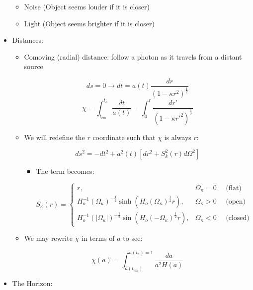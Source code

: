 \begin{itemize}
\begin{itemize}
      \item Noise (Object seems louder if it is closer)

      \item Light (Object seems brighter if it is closer)

    \end{itemize}

  \item Distances:

    \begin{itemize}
        
      \item Comoving (radial) distance: follow a photon as it travels from a distant source

        $$ds=0 \to dt=a(t)\frac{dr}{\left( 1-\kappa r^2 \right)^{\frac{1}{2}}}$$
        $$\chi=\int_{t_{em}}^{t_o}\frac{dt}{a(t)}=\int_0^r \frac{dr'}{\left( 1-\kappa r'^2 \right)^{\frac{1}{2}}}$$

      \item We will redefine the $r$ coordinate such that $\chi$ is always $r$:

        $$ds^2=-dt^2+a^2(t)\left[ dr^2+S^{2}_{k}(r)d\Omega^2 \right]$$

        \begin{itemize}

          \item The term becomes:

            $$S_{\kappa}(r)=\left\{\begin{array}{ll} r,& \Omega_{\kappa}=0\quad\text{ (flat)}\\H_o^{-1}(\Omega_{\kappa})^{-\frac{1}{2}}\sinh\left( H_o(\Omega_{\kappa})^{\frac{1}{2}}r \right),& \Omega_{\kappa}>0\quad\text{ (open)}\\H_o^{-1}(|\Omega_{\kappa}|)^{-\frac{1}{2}}\sin\left( H_o(-\Omega_{\kappa})^{\frac{1}{2}}r \right),& \Omega_{\kappa}<0\quad\text{ (closed)}\end{array}$$

        \end{itemize}

      \item We may rewrite $\chi$ in terms of $a$ to see:

        $$\chi(a)=\int_{a(t_{em})}^{a(t_o)=1}\frac{da}{a^2H(a)}$$

    \end{itemize}

  \item The Horizon:


\end{itemize}
